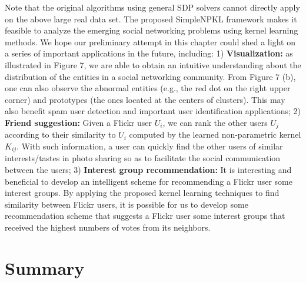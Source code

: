 Note that the original algorithms using general SDP solvers cannot directly apply on the above large real data set. The proposed SimpleNPKL framework makes it feasible to analyze the emerging social networking problems using kernel learning methods. We hope our preliminary attempt in this chapter could shed a light on a series of important applications in the future, including: 1) {\bf Visualization:} as illustrated in Figure 7, we are able to obtain an intuitive understanding about the distribution of the entities in a social networking community. From Figure 7 (b), one can also observe the abnormal entities (e.g., the red dot on the right upper corner) and prototypes (the ones located at the centers of clusters). This may also benefit spam user detection and important user identification applications;  2) {\bf Friend suggestion:} Given a Flickr user $U_i$, we can rank the other users $U_j$ according to their similarity to $U_i$ computed by the learned non-parametric kernel $K_{ij}$. With such information, a user can quickly find the other users of similar interests/tastes in photo sharing so as to facilitate the social communication between the users; 3) {\bf Interest group recommendation:} It is interesting and beneficial to develop an intelligent scheme for recommending a Flickr user some interest groups. By applying the proposed kernel learning techniques to find similarity between Flickr users, it is possible for us to develop some recommendation scheme that suggests a Flickr user some interest groups that received the highest numbers of votes from its neighbors.


\section{Summary}\label{sec:con}

